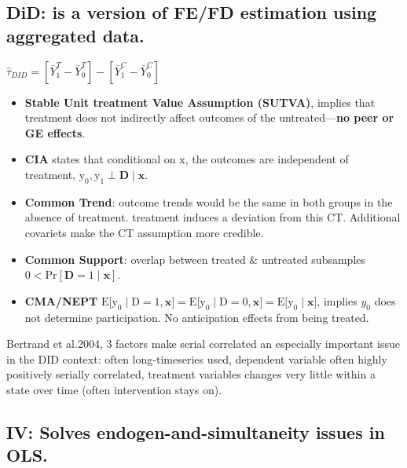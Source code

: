 \documentclass[
]{article}
\providecommand{\tightlist}{%
  \setlength{\itemsep}{0pt}\setlength{\parskip}{0pt}}
\begin{document}
\hypertarget{did-is-a-version-of-fefd-estimation-using-aggregated-data.}{%
\subsection{DiD: is a version of FE/FD estimation using aggregated
data.}\label{did-is-a-version-of-fefd-estimation-using-aggregated-data.}}

\(\hat{\tau}_{D I D}=\left[\bar{Y}_{1}^{T}-\bar{Y}_{0}^{T}\right]-\left[\bar{Y}_{1}^{C}-\bar{Y}_{0}^{C}\right]\)

\begin{itemize}
\tightlist
\item
  \textbf{Stable Unit treatment Value Assumption (SUTVA)}, implies that
  treatment does not indirectly affect outcomes of the
  untreated---\textbf{no peer or GE effects}.\\
\item
  \textbf{CIA} states that conditional on \(\mathrm{x}\), the outcomes
  are independent of treatment,
  \(\mathrm{y_0, y_1 \perp \mathbf{D}\mid \mathbf{x}}.\)\\
\item
  \textbf{Common Trend}: outcome trends would be the same in both groups
  in the absence of treatment. treatment induces a deviation from this
  CT. Additional covariets make the CT assumption more credible.\\
\item
  \textbf{Common Support}: overlap between treated \& untreated
  subsamples \(\mathrm{0<Pr[\mathbf{D}=1\mid \mathbf{x}]}\).\\
\item
  \textbf{CMA/NEPT}
  \(\mathrm{E\bigl[y_0\mid D=1,\mathbf{x}\bigr]=E\bigl[y_0\mid D=0,\mathbf{x}\bigr]=E\bigl[y_0\mid\mathbf{x}\bigr]}\),
  implies \(y_0\) does not determine participation. No anticipation
  effects from being treated.
\end{itemize}

Bertrand et al.2004, 3 factors make serial correlated an especially
important issue in the DID context: often long-timeseries used,
dependent variable often highly positively serially correlated,
treatment variables changes very little within a state over time (often
intervention stays on).

\hypertarget{iv-solves-endogen-and-simultaneity-issues-in-ols.}{%
\subsection{\texorpdfstring{\textbf{IV}: Solves endogen-and-simultaneity
issues in
OLS.}{IV: Solves endogen-and-simultaneity issues in OLS.}}\label{iv-solves-endogen-and-simultaneity-issues-in-ols.}}
\end{document}
